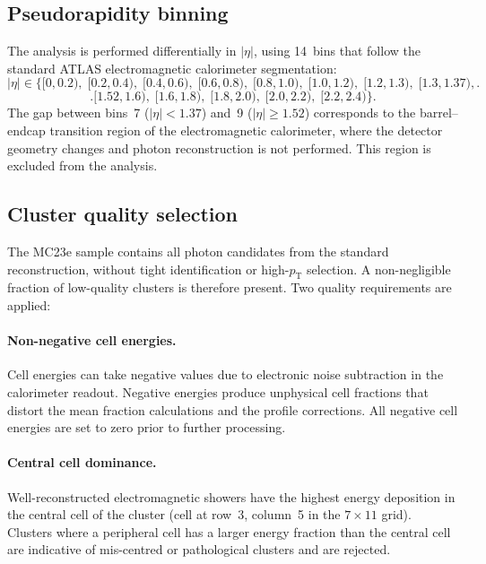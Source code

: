 \documentclass[12pt,a4paper]{article}
\begin{document}
\subsection{Pseudorapidity binning}
\label{sec:data:eta}

The analysis is performed differentially in $|\eta|$, using 14~bins that
follow the standard ATLAS electromagnetic calorimeter segmentation:
\begin{equation}
  |\eta| \in
  \bigl\{
    [0,0.2),\;
    [0.2,0.4),\;
    [0.4,0.6),\;
    [0.6,0.8),\;
    [0.8,1.0),\;
    [1.0,1.2),\;
    [1.2,1.3),\;
    [1.3,1.37),
  \bigr.
  \label{eq:etabins1}
\end{equation}
\begin{equation}
  \bigl.
    [1.52,1.6),\;
    [1.6,1.8),\;
    [1.8,2.0),\;
    [2.0,2.2),\;
    [2.2,2.4)
  \bigr\}.
  \label{eq:etabins2}
\end{equation}
The gap between bins~7 ($|\eta|<1.37$) and~9 ($|\eta|\geq 1.52$)
corresponds to the barrel--endcap transition region of the electromagnetic
calorimeter, where the detector geometry changes and photon reconstruction is
not performed. This region is excluded from the analysis.

\subsection{Cluster quality selection}
\label{sec:data:quality}

The MC23e sample contains all photon candidates from the standard
reconstruction, without tight identification or high-$p_\text{T}$ selection.
A non-negligible fraction of low-quality clusters is therefore present. Two
quality requirements are applied:

\paragraph{Non-negative cell energies.}
Cell energies can take negative values due to electronic noise subtraction in
the calorimeter readout. Negative energies produce unphysical cell fractions
that distort the mean fraction calculations and the profile corrections. All
negative cell energies are set to zero prior to further processing.

\paragraph{Central cell dominance.}
Well-reconstructed electromagnetic showers have the highest energy deposition
in the central cell of the cluster (cell at row~3, column~5 in the
$7\times 11$ grid). Clusters where a peripheral cell has a larger energy
fraction than the central cell are indicative of mis-centred or pathological
clusters and are rejected.
\end{document}
